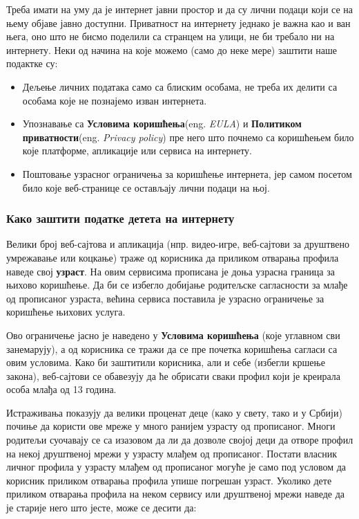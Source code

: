 \documentclass[a4paper]{article}
\begin{document}
Треба имати на уму да је интернет јавни простор и да су лични подаци који се на њему објаве јавно доступни. Приватност на интернету једнако је важна као и ван њега, оно што не бисмо поделили са странцем на улици, не би требало ни на интернету. Неки од начина на које можемо (само до неке мере) заштити наше подактке  су:
	
\begin{itemize}
	
\item     Дељење личних података само са блиским особама, не треба их делити са особама које не познајемо изван интернета.

\item     Упознавање са \textbf{Условима коришћења}(eng. \emph{EULA}\cite{EULA}) и \textbf{Политиком приватности}(eng. \emph{Privacy policy}) пре него што почнемо са коришћењем било које платформе, апликације или сервиса на интернету.
    
\item    Поштовање узрасног ограничења за коришћење интернета, јер самом посетом било које веб-странице се остављају лични подаци на њој.
    

\end{itemize}  

\subsubsection{Како заштити податке детета на интернету}

Велики број веб-сајтова и апликација (нпр. видео-игре, веб-сајтови за друштвено умрежавање или коцкање) траже од корисника да приликом отварања профила наведе свој \textbf{узраст}. На овим сервисима прописана је доња узрасна граница за њихово коришћење.
Да би се избегло добијање родитељске сагласности за млађе од прописаног узраста, већина сервиса поставила је узрасно ограничење за коришћење њихових услуга.

Ово ограничење јасно је наведено у \textbf{Условима коришћења} (које углавном сви занемарују), а од корисника се тражи да се пре почетка коришћења сагласи са овим условима. Како би заштитили корисника, али и себе (избегли кршење закона), веб-сајтови се обавезују да ће обрисати сваки профил који је креирала особа млађа од 13 година. 

Истраживања показују да велики проценат деце (како у свету, тако и у Србији) почиње да користи ове мреже у много ранијем узрасту од прописаног.
Многи родитељи суочавају се са изазовом да ли да дозволе својој деци да отворе профил на некој друштвеној мрежи у узрасту млађем од прописаног. Постати власник личног профила у узрасту млађем од прописаног могуће је само под условом да корисник приликом отварања профила упише погрешан узраст.
Уколико дете приликом отварања профила на неком сервису или друштвеној мрежи наведе да је старије него што јесте, може се десити да:
\end{document}
